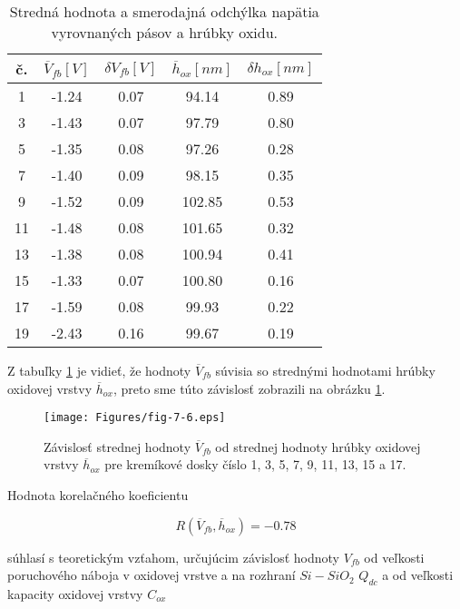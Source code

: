 \begin{table}[h!]\centering
\begin{tabular}{|c|c|c|c|c|}
\hline
č. & $\overline V_{fb} [V]$ & $\delta V_{fb} [V]$ & $\overline h_{ox} [nm]$ & $\delta h_{ox} [nm]$ \\ 
\hline
 1 & -1.24 & 0.07 &  94.14 & 0.89 \\
 3 & -1.43 & 0.07 &  97.79 & 0.80 \\
 5 & -1.35 & 0.08 &  97.26 & 0.28 \\
 7 & -1.40 & 0.09 &  98.15 & 0.35 \\
 9 & -1.52 & 0.09 & 102.85 & 0.53 \\
11 & -1.48 & 0.08 & 101.65 & 0.32 \\
13 & -1.38 & 0.08 & 100.94 & 0.41 \\
15 & -1.33 & 0.07 & 100.80 & 0.16 \\
17 & -1.59 & 0.08 &  99.93 & 0.22 \\
19 & -2.43 & 0.16 &  99.67 & 0.19 \\
\hline
\end{tabular}
\captionsetup{justification=raggedright, singlelinecheck=false}
{\caption[Stredná hodnota a smerodajná odchýlka napätia vyrovnaných
    pásov a hrúbky oxidu]{Stredná hodnota a smerodajná odchýlka
    napätia vyrovnaných pásov a hrúbky oxidu.}\label{tab:7.4}}
\end{table}

Z tabuľky \ref{tab:7.4} je vidieť, že hodnoty $\overline V_{fb}$
súvisia so strednými hodnotami hrúbky oxidovej vrstvy $\overline
h_{ox}$, preto sme túto závislosť zobrazili na obrázku \ref{fig:7.6}.

\begin{figure}[h!]\centering
\texttt{[image: Figures/fig-7-6.eps]}
\captionsetup{justification=raggedright, singlelinecheck=false}
{\caption[Závislosť strednej hodnoty $\overline V_{fb}$ od strednej
    hodnoty hrúbky oxidovej vrstvy $\overline h_{ox}$]{Závislosť
    strednej hodnoty $\overline V_{fb}$ od strednej hodnoty hrúbky
    oxidovej vrstvy $\overline h_{ox}$ pre kremíkové dosky číslo 1, 3,
    5, 7, 9, 11, 13, 15 a 17.}\label{fig:7.6}}
\end{figure}

Hodnota korelačného koeficientu

$$R(\overline V_{fb} ,\overline h_{ox}) = -0.78$$

súhlasí s teoretickým vzťahom, určujúcim závislosť hodnoty $V_{fb}$ od
veľkosti poruchového náboja v oxidovej vrstve a na rozhraní
$Si-SiO_{2}$ $Q_{dc}$ a od veľkosti kapacity oxidovej vrstvy $C_{ox}$

